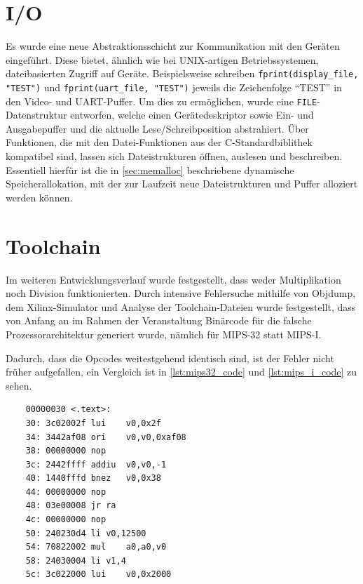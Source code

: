 \section{I/O}

Es wurde eine neue Abstraktionsschicht zur Kommunikation mit den Geräten eingeführt. Diese bietet, ähnlich wie bei UNIX-artigen Betriebssystemen, dateibasierten Zugriff auf Geräte. Beispielsweise schreiben \texttt{fprint(display_file, "TEST")} und \texttt{fprint(uart_file, "TEST")} jeweils die Zeichenfolge \enquote{TEST} in den Video- und \gls{UART}-Puffer.  
Um dies zu ermöglichen, wurde eine \texttt{FILE}-Datenstruktur entworfen, welche einen Gerätedeskriptor sowie Ein- und Ausgabepuffer und die aktuelle Lese/Schreibposition abstrahiert. Über Funktionen, die mit den Datei-Funktionen aus der C-Standardbiblithek kompatibel sind, lassen sich Dateistrukturen öffnen, auslesen und beschreiben.
Essentiell hierfür ist die in \cref{sec:memalloc} beschriebene dynamische Speicherallokation, mit der zur Laufzeit neue Dateistrukturen und Puffer alloziert werden können.

\section{Toolchain}

Im weiteren Entwicklungsverlauf wurde festgestellt, dass weder Multiplikation noch Division funktionierten. Durch intensive Fehlersuche mithilfe von Objdump, dem Xilinx-Simulator und Analyse der Toolchain-Dateien wurde festgestellt, dass von Anfang an im Rahmen der Veranstaltung \textit{\subjectphv{}} Binärcode für die falsche Prozessorarchitektur generiert wurde, nämlich für \gls{MIPS}-32 statt \gls{MIPS}-\RN{1}. 

Dadurch, dass die Opcodes weitestgehend identisch sind, ist der Fehler nicht früher aufgefallen, ein Vergleich ist in \cref{lst:mips32_code} und \cref{lst:mips_i_code} zu sehen. 

\begin{code}	
	\begin{verbatim}
	00000030 <.text>:
	30:	3c02002f lui	v0,0x2f
	34:	3442af08 ori	v0,v0,0xaf08
	38:	00000000 nop
	3c:	2442ffff addiu	v0,v0,-1
	40:	1440fffd bnez	v0,0x38
	44:	00000000 nop
	48:	03e00008 jr	ra
	4c:	00000000 nop
	50:	240230d4 li	v0,12500
	54:	70822002 mul	a0,a0,v0
	58:	24030004 li	v1,4
	5c:	3c022000 lui	v0,0x2000
	\end{verbatim}
	
	\caption{MIPS-32 code (Für Plasma nicht geeignet)}
	\label{lst:mips32_code}
\end{code}


